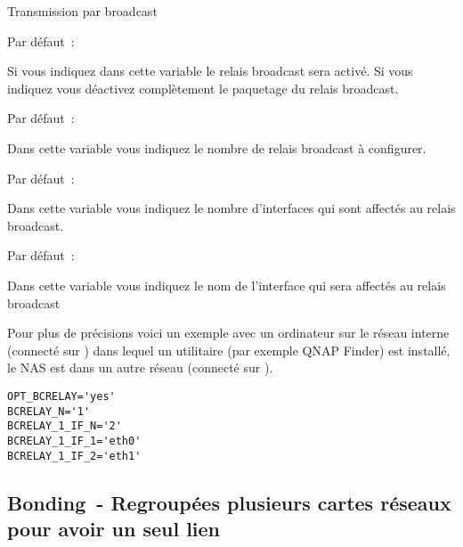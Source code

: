 \begin{description}

 Transmission par broadcast

  Par défaut~: 

  Si vous indiquez  dans cette variable le relais broadcast sera activé.
  Si vous indiquez  vous déactivez complètement le paquetage du relais broadcast.


  Par défaut~: 

  Dans cette variable vous indiquez le nombre de relais broadcast à configurer.


  Par défaut~: 

  Dans cette variable vous indiquez le nombre d'interfaces qui sont affectés au
  relais broadcast.


  Par défaut~: 

  Dans cette variable vous indiquez le nom de l'interface qui sera affectés au
  relais broadcast

\end{description}

Pour plus de précisions voici un exemple avec un ordinateur sur le réseau interne (connecté
sur ) dans lequel un utilitaire (par exemple QNAP Finder) est installé, le NAS est
dans un autre réseau (connecté sur ).

\begin{example}
\begin{verbatim}
OPT_BCRELAY='yes'
BCRELAY_N='1'
BCRELAY_1_IF_N='2'
BCRELAY_1_IF_1='eth0'
BCRELAY_1_IF_2='eth1'
\end{verbatim}
\end{example}

\subsection{Bonding~- Regroupées plusieurs cartes réseaux pour avoir un seul lien}

